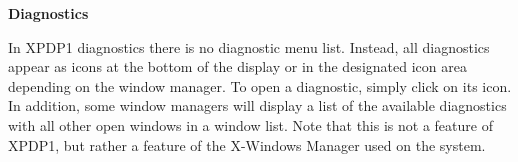 \begin{section}
\begin{subsection}
\end{subsection}	%

\begin{subsection}	%
{\bf Diagnostics}

   In XPDP1 diagnostics there is no diagnostic menu list.  Instead, all
   diagnostics appear as icons at the bottom of the display or in the
   designated icon area depending on the window manager.  To open a diagnostic,
   simply click on its icon.  In addition, some window managers will display a
   list of the available diagnostics with all other open windows in a window
   list.  Note that this is not a feature of XPDP1, but rather a feature of the
   X-Windows Manager used on the system.

\end{subsection}	%
\end{section}		%

